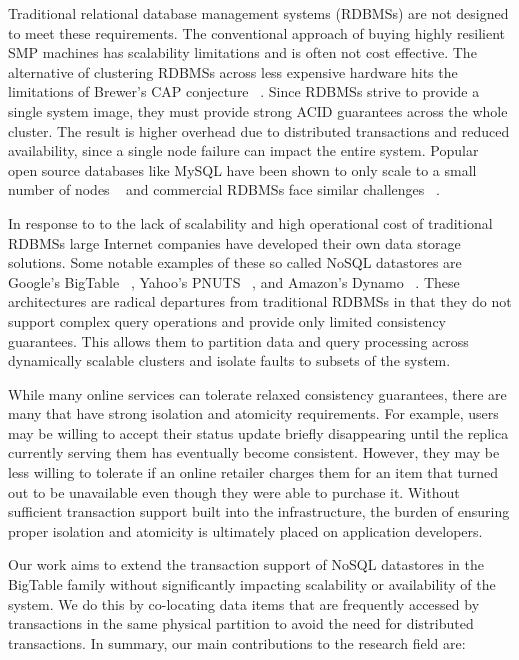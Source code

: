 \documentclass[10pt,final,journal]{IEEEtran}
\begin{document}
Traditional relational database management systems (RDBMSs) are not designed to meet these requirements. The conventional approach of buying highly resilient SMP machines has scalability limitations and is often not cost effective. The alternative of clustering RDBMSs across less expensive hardware hits the limitations of Brewer's CAP conjecture ~\cite{gilbert2002brewer}. Since RDBMSs strive to provide a single system image, they must provide strong ACID guarantees across the whole cluster. The result is higher overhead due to distributed transactions and reduced availability, since a single node failure can impact the entire system. Popular open source databases like MySQL have been shown to only scale to a small number of nodes ~\cite{Malkowski:2010:EAD:1774088.1774449} and commercial RDBMSs face similar challenges ~\cite{Campbell:2010:ESF:1807167.1807280}.

In response to to the lack of scalability and high operational cost of traditional RDBMSs large Internet companies have developed their own data storage solutions. Some notable examples of these so called NoSQL datastores are Google's BigTable ~\cite{Chang:2006:BDS:1267308.1267323}, Yahoo's PNUTS ~\cite{Cooper:2008:PYH:1454159.1454167}, and Amazon's Dynamo ~\cite{DeCandia:2007:DAH:1323293.1294281}. These architectures are radical departures from traditional RDBMSs in that they do not support complex query operations and provide only limited consistency guarantees. This allows them to partition data and query processing across dynamically scalable clusters and isolate faults to subsets of the system.

While many online services can tolerate relaxed consistency guarantees, there are many that have strong isolation and atomicity requirements. For example, users may be willing to accept their status update briefly disappearing until the replica currently serving them has eventually become consistent. However, they may be less willing to tolerate if an online retailer charges them for an item that turned out to be unavailable even though they were able to purchase it. Without sufficient transaction support built into the infrastructure, the burden of ensuring proper isolation and atomicity is ultimately placed on application developers.

Our work aims to extend the transaction support of NoSQL datastores in the BigTable family without significantly impacting scalability or availability of the system. We do this by co-locating data items that are frequently accessed by transactions in the same physical partition to avoid the need for distributed transactions. In summary, our main contributions to the research field are:
\end{document}
